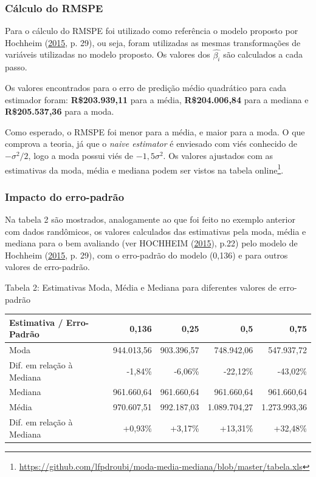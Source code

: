 \documentclass[a4paper, 12pt]{article}
\let\rmarkdownfootnote\footnote%
\def\footnote{\protect\rmarkdownfootnote}
\begin{document}
\subsubsection{Cálculo do RMSPE}\label{calculo-do-rmspe}

Para o cálculo do RMSPE foi utilizado como referência o modelo proposto
por Hochheim (\protect\hyperlink{ref-hochheim}{2015}, p. 29), ou seja,
foram utilizadas as mesmas transformações de variáveis utilizadas no
modelo proposto. Os valores dos \(\hat{\beta_i}\) são calculados a cada
passo.

Os valores encontrados para o erro de predição médio quadrático para
cada estimador foram: \textbf{R\$203.939,11} para a média,
\textbf{R\$204.006,84} para a mediana e \textbf{R\$205.537,36} para a
moda.

Como esperado, o RMSPE foi menor para a média, e maior para a moda. O
que comprova a teoria, já que o \emph{naive estimator} é enviesado com
viés conhecido de \(-\sigma^2/2\), logo a moda possui viés de
\(-1,5\sigma^2\). Os valores ajustados com as estimativas da moda, média
e mediana podem ser vistos na tabela online\footnote{\url{https://github.com/lfpdroubi/moda-media-mediana/blob/master/tabela.xls}}.

\subsubsection{Impacto do erro-padrão}\label{impacto-do-erro-padrao}

Na tabela 2 são mostrados, analogamente ao que foi feito no exemplo
anterior com dados randômicos, os valores calculados das estimativas
pela moda, média e mediana para o bem avaliando (ver HOCHHEIM
(\protect\hyperlink{ref-hochheim}{2015}), p.22) pelo modelo de Hochheim
(\protect\hyperlink{ref-hochheim}{2015}, p. 29), com o erro-padrão do
modelo (0,136) e para outros valores de erro-padrão.

Tabela 2: Estimativas Moda, Média e Mediana para diferentes valores de
erro-padrão

\begin{longtable}[]{@{}lrrrr@{}}
\toprule
Estimativa / Erro-Padrão & 0,136 & 0,25 & 0,5 & 0,75\tabularnewline
\midrule
\endhead
Moda & 944.013,56 & 903.396,57 & 748.942,06 & 547.937,72\tabularnewline
Dif. em relação à Mediana & -1,84\% & -6,06\% & -22,12\% &
-43,02\%\tabularnewline
Mediana & 961.660,64 & 961.660,64 & 961.660,64 &
961.660,64\tabularnewline
Média & 970.607,51 & 992.187,03 & 1.089.704,27 &
1.273.993,36\tabularnewline
Dif. em relação à Mediana & +0,93\% & +3,17\% & +13,31\% &
+32,48\%\tabularnewline
\bottomrule
\end{longtable}
\end{document}
